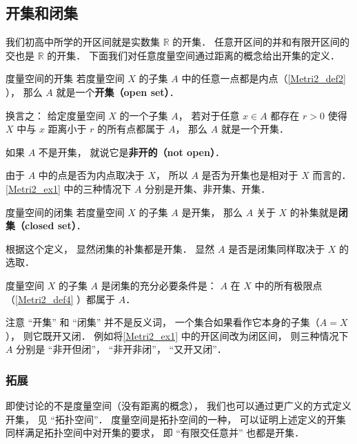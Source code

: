 
\subsection{开集和闭集}
我们初高中所学的开区间就是实数集 $\mathbb R$ 的开集． 任意开区间的并和有限开区间的交也是 $\mathbb R$ 的开集． 下面我们对任意度量空间通过距离的概念给出开集的定义．

\begin{definition}{度量空间的开集}
若度量空间 $X$ 的子集 $A$ 中的任意一点都是内点（\autoref{Metri2_def2} ）， 那么 $A$ 就是一个\textbf{开集（open set）}．

换言之： 给定度量空间 $X$ 的一个子集 $A$， 若对于任意 $x \in A$ 都存在 $r > 0$ 使得 $X$ 中与 $x$ 距离小于 $r$ 的所有点都属于 $A$， 那么 $A$ 就是一个开集．

如果 $A$ 不是开集， 就说它是\textbf{非开的（not open）}．
\end{definition}
由于 $A$ 中的点是否为内点取决于 $X$， 所以 $A$ 是否为开集也是相对于 $X$ 而言的． \autoref{Metri2_ex1} 中的三种情况下 $A$ 分别是开集、非开集、开集．

\begin{definition}{度量空间的闭集}
若度量空间 $X$ 的子集 $A$ 是开集， 那么 $A$ 关于 $X$ 的补集就是\textbf{闭集（closed set）}．
\end{definition}
根据这个定义， 显然闭集的补集都是开集． 显然 $A$ 是否是闭集同样取决于 $X$ 的选取．

\begin{theorem}{}
度量空间 $X$ 的子集 $A$ 是闭集的充分必要条件是： $A$ 在 $X$ 中的所有极限点（\autoref{Metri2_def4} ）都属于 $A$．
\end{theorem}
注意 “开集” 和 “闭集” 并不是反义词， 一个集合如果看作它本身的子集（$A = X$）， 则它既开又闭． 例如将\autoref{Metri2_ex1} 中的开区间改为闭区间， 则三种情况下 $A$ 分别是 “非开但闭”， “非开非闭”， “又开又闭”．

\subsubsection{拓展}
即使讨论的不是度量空间（没有距离的概念）， 我们也可以通过更广义的方式定义开集， 见 “拓扑空间”． 度量空间是拓扑空间的一种， 可以证明上述定义的开集同样满足拓扑空间中对开集的要求， 即 “有限交任意并” 也都是开集．

